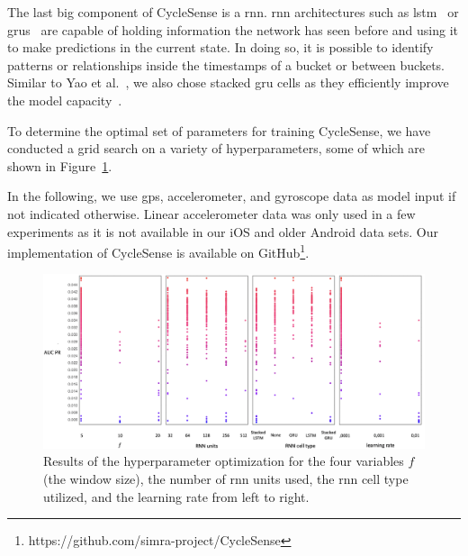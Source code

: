 The last big component of CycleSense is a \ac{rnn}.
\ac{rnn} architectures such as \ac{lstm}~\cite{hochreiter1997long} or \acp{gru}~\cite{chung2014empirical} are capable of holding information the network has seen before and using it to make predictions in the current state. 
In doing so, it is possible to identify patterns or relationships inside the timestamps of a bucket or between buckets. 
Similar to Yao et al.\ \cite{yao2017deepsense}, we also chose stacked \ac{gru} cells as they efficiently improve the model capacity~\cite{goodfellow2016deep}.

To determine the optimal set of parameters for training CycleSense, we have conducted a grid search on a variety of hyperparameters, some of which are shown in Figure~\ref{fig:hpo}.

In the following, we use \ac{gps}, accelerometer, and gyroscope data as model input if not indicated otherwise.  
Linear accelerometer data was only used in a few experiments as it is not available in our iOS and older Android data sets.
Our implementation of CycleSense is available on GitHub\footnote{https://github.com/simra-project/CycleSense}.

\begin{figure}[t]
	\centering
	\includegraphics[width=\textwidth]{fig/hpo_results.png}
	\caption{Results of the hyperparameter optimization for the four variables $f$ (the window size), the number of \ac{rnn} units used, the \ac{rnn} cell type utilized, and the learning rate from left to right.}
	\label{fig:hpo}
\end{figure}

